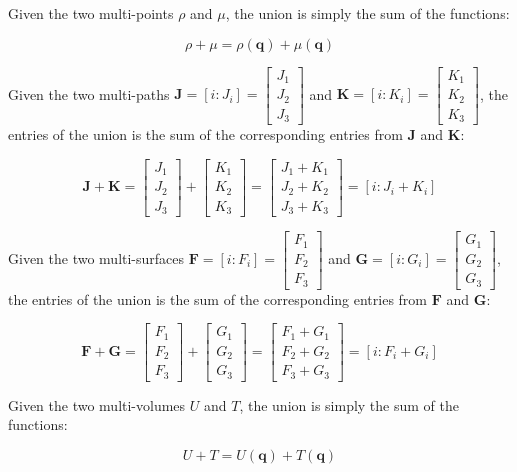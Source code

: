 \begin{thm}
Given the two multi-points \(\rho\) and \(\mu\), the union is simply the sum of the functions:

\[\rho + \mu = \rho(\mathbf{q}) + \mu(\mathbf{q})\]


Given the two multi-paths \(\mathbf{J} = [i : J_i] = \begin{bmatrix} J_1 \\ J_2 \\ J_3 \end{bmatrix}\) and \(\mathbf{K} = [i : K_i] = \begin{bmatrix} K_1 \\ K_2 \\ K_3 \end{bmatrix}\), the entries of the union is the sum of the corresponding entries from \(\mathbf{J}\) and \(\mathbf{K}\):

\[\mathbf{J} + \mathbf{K} = \begin{bmatrix} J_1 \\ J_2 \\ J_3 \end{bmatrix} + \begin{bmatrix} K_1 \\ K_2 \\ K_3 \end{bmatrix} = \begin{bmatrix} J_1 + K_1 \\ J_2 + K_2 \\ J_3 + K_3 \end{bmatrix} = [i : J_i + K_i]\]


Given the two multi-surfaces \(\mathbf{F} = [i : F_i] = \begin{bmatrix} F_1 \\ F_2 \\ F_3 \end{bmatrix}\) and \(\mathbf{G} = [i : G_i] = \begin{bmatrix} G_1 \\ G_2 \\ G_3 \end{bmatrix}\), the entries of the union is the sum of the corresponding entries from \(\mathbf{F}\) and \(\mathbf{G}\):

\[\mathbf{F} + \mathbf{G} = \begin{bmatrix} F_1 \\ F_2 \\ F_3 \end{bmatrix} + \begin{bmatrix} G_1 \\ G_2 \\ G_3 \end{bmatrix} = \begin{bmatrix} F_1 + G_1 \\ F_2 + G_2 \\ F_3 + G_3 \end{bmatrix} = [i : F_i + G_i]\]


Given the two multi-volumes \(U\) and \(T\), the union is simply the sum of the functions:

\[U + T = U(\mathbf{q}) + T(\mathbf{q})\]
\end{thm}




